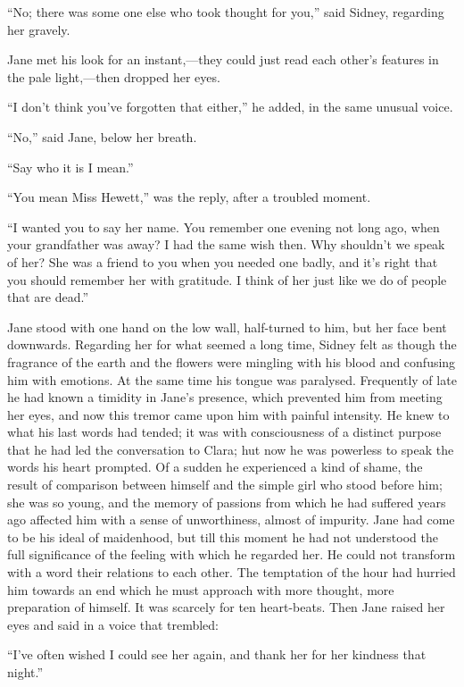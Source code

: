``No; there was some one else who took thought for you,'' said Sidney,
regarding her gravely.

Jane met his look for an instant,---they could just read each other's
features in the pale light,---then dropped her eyes.

``I don't think you've forgotten that either,'' he added, in the same
unusual voice.

{}``No,'' said Jane, below her breath.

``Say who it is I mean.''

``You mean Miss Hewett,'' was the reply, after a troubled moment.

``I wanted you to say her name. You remember one evening not long ago,
when your grandfather was away? I had the same wish then. Why shouldn't
we speak of her? She was a friend to you when you needed one badly, and
it's right that you should remember her with gratitude. I think of her
just like we do of people that are dead.''

Jane stood with one hand on the low wall, half-turned to him, but her
face bent downwards. Regarding her for what seemed a long time, Sidney
felt as though the fragrance of the earth and the flowers were mingling
with his blood and confusing him with emotions. At the same time his
tongue was paralysed. Frequently of late he had known a timidity in
Jane's presence, which prevented him from meeting her eyes, and now this
tremor came upon him with painful intensity. He knew to what his last
{}words had tended; it was with consciousness of a distinct purpose that
he had led the conversation to Clara; hut now he was powerless to speak
the words his heart prompted. Of a sudden he experienced a kind of
shame, the result of comparison between himself and the simple girl who
stood before him; she was so young, and the memory of passions from
which he had suffered years ago affected him with a sense of
unworthiness, almost of impurity. Jane had come to be his ideal of
maidenhood, but till this moment he had not understood the full
significance of the feeling with which he regarded her. He could not
transform with a word their relations to each other. The temptation of
the hour had hurried him towards an end which he must approach with more
thought, more preparation of himself. It was scarcely for ten
heart-beats. Then Jane raised her eyes and said in a voice that
trembled:

``I've often wished I could see her again, and thank her for her
kindness that night.''

